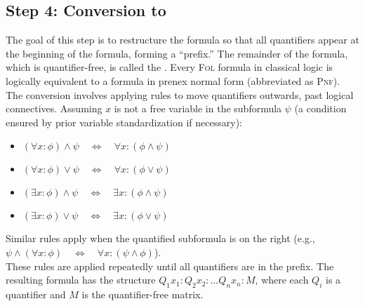\subsection{Step 4: Conversion to }
The goal of this step is to restructure the formula so that all quantifiers appear at the beginning of the
formula, forming a ``prefix.'' The remainder of the formula, which is quantifier-free, is called the
.  Every \textsc{Fol} formula in classical logic is logically equivalent to a formula in prenex
normal form (abbreviated as \textsc{Pnf}). 
The conversion involves applying rules to move quantifiers outwards, past logical connectives. Assuming $x$ is
not a free variable in the subformula $\psi$ (a condition ensured by prior variable standardization if
necessary): 
\begin{itemize}
    \item $(\forall x: \phi) \land \psi \quad\Leftrightarrow\quad \forall x: (\phi \land \psi)$
    \item $(\forall x: \phi) \lor \psi \quad\Leftrightarrow\quad \forall x: (\phi \lor \psi)$
    \item $(\exists x: \phi) \land \psi \quad\Leftrightarrow\quad \exists x: (\phi \land \psi)$
    \item $(\exists x: \phi) \lor \psi \quad\Leftrightarrow\quad \exists x: (\phi \lor \psi)$
\end{itemize}
Similar rules apply when the quantified subformula is on the right (e.g.,
\\[0.2cm]
\hspace*{1.3cm}
$\psi \land (\forall x: \phi)  \quad\Leftrightarrow\quad \forall x: (\psi \land \phi)$).
\\[0.2cm]
These rules are applied repeatedly until all quantifiers are in the prefix. The
resulting formula has the structure $Q_1 x_1: Q_2 x_2: \dots Q_n x_n: M$, where each $Q_i$ is a quantifier and $M$
is the quantifier-free matrix. 

